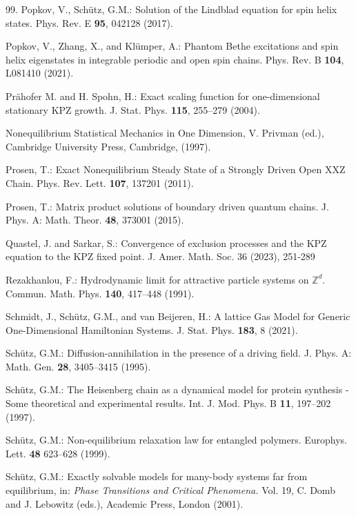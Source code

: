 \documentclass[12pt]{article}
\begin{document}
\begin{thebibliography}{99.}
Popkov, V., Sch\"utz, G.M.:
Solution of the Lindblad equation for spin helix states.
Phys. Rev. E \textbf{95}, 042128 (2017).

Popkov, V., Zhang, X., and Kl\"umper, A.:
Phantom Bethe excitations and spin helix eigenstates in integrable periodic and open spin chains. 
Phys. Rev. B \textbf{104}, L081410 (2021).

Pr\"ahofer M. and H. Spohn, H.:
Exact scaling function for one-dimensional stationary KPZ growth.
J. Stat. Phys. \textbf{115}, 255--279 (2004).

Nonequilibrium Statistical Mechanics in One Dimension, V. Privman (ed.),
Cambridge University Press, Cambridge, (1997).

Prosen, T.:
Exact Nonequilibrium Steady State of a Strongly Driven Open XXZ Chain.
Phys. Rev. Lett. \textbf{107}, 137201 (2011).

Prosen, T.:
Matrix product solutions of boundary driven quantum chains.
J. Phys. A: Math. Theor. {\bf 48}, 373001 (2015).

Quastel, J. and Sarkar, S.:
Convergence of exclusion processes and the KPZ equation to the KPZ fixed point.
J. Amer. Math. Soc. 36 (2023), 251-289 

Rezakhanlou, F.: 
Hydrodynamic limit for attractive particle systems on $\mathbb Z^d$.
Commun. Math. Phys. \textbf{140}, 417--448 (1991).

Schmidt, J., Sch\"utz, G.M., and van Beijeren, H.: 
A lattice Gas Model for Generic One-Dimensional Hamiltonian Systems. 
J. Stat. Phys. \textbf{183}, 8 (2021). 

Sch\"utz, G.M.:
Diffusion-annihilation in the presence of a driving field.
J. Phys. A: Math. Gen. \textbf{28},  3405--3415 (1995).

Sch\"utz, G.M.:
The Heisenberg chain as a dynamical model for protein synthesis 
- Some theoretical and experimental results.
Int. J. Mod. Phys. B \textbf{11}, 197--202 (1997).

Sch\"utz, G.M.:
Non-equilibrium relaxation law for entangled polymers.
Europhys. Lett. {\bf 48} 623--628 (1999).

Sch\"utz, G.M.:
Exactly solvable models for many-body systems far from equilibrium, in: 
{\it Phase Transitions and Critical Phenomena.} Vol. 19, 
C. Domb and J. Lebowitz (eds.), 
Academic Press, London (2001).


\end{thebibliography}
\end{document}
